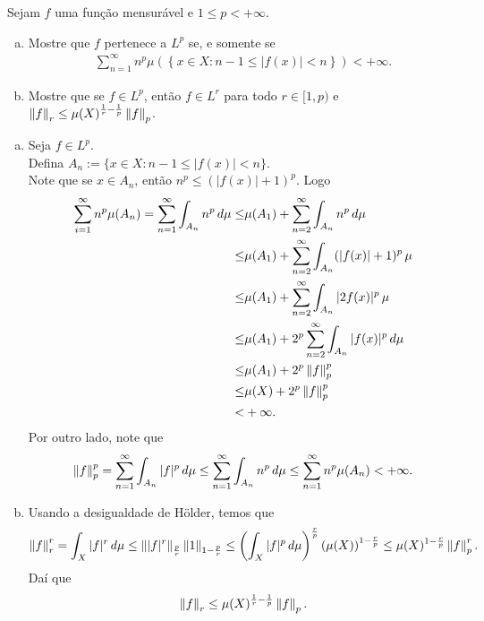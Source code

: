 \begin{homeworkProblem}[2]
  Sejam $f$ uma função mensurável e $1\leq p<+\infty$.
  \begin{enumerate}[a)]
    \item Mostre que $f$ pertenece a $L^{p}$ se, e somente se
      \begin{align*}
        \sum_{n=1}^{\infty}n^{p}\mu\left( \left\{ x\in X:n-1\leq |f(x)|<n \right\} \right)<+\infty.
      \end{align*}
    \item Mostre que se $f\in L^{p}$, então $f\in L^{r}$ para todo $r\in [1,p)$ e $\left\|f\right\|_{r}\leq \mu(X)^{\frac{1}{r}-\frac{1}{p}}\left\|f\right\|_p$. 
  \end{enumerate}
  \begin{solution}
  \begin{enumerate}[a)]
    \item Seja $f\in L^{p}$.\\
      Defina $A_n:=\{x\in X:n-1\leq |f(x)|<n\}$.\\
      Note que se $x\in A_n$, então $n^{p}\leq (|f(x)|+1)^{p}$. Logo
      \begin{align*}
        \sum_{i=1}^{\infty}n^{p}\mu(A_n)=\sum_{n=1}^{\infty}\int_{A_n}n^{p}\,d\mu\leq &\mu(A_1)+\sum_{n=2}^{\infty}\int_{A_n}n^{p}\,d\mu\\
        \leq& \mu(A_1)+\sum_{n=2}^{\infty}\int_{A_n}(|f(x)|+1)^{p}\,\mu\\
        \leq& \mu(A_1)+\sum_{n=2}^{\infty}\int_{A_n}|2f(x)|^{p}\,\mu\\
        \leq& \mu(A_1)+2^{p}\sum_{n=2}^{\infty}\int_{A_n}|f(x)|^{p}\,d\mu\\
        \leq& \mu(A_1)+2^{p}\left\|f\right\|_p^{p}\\
        \leq& \mu(X)+2^{p}\left\|f\right\|_{p}^{p}\\
        <& +\infty.
      \end{align*}
      Por outro lado, note que
      \begin{align*}
        \left\|f\right\|_{p}^{p}=\sum_{n=1}^{\infty}\int_{A_n}|f|^{p}\,d\mu\leq \sum_{n=1}^{\infty}\int_{A_n}n^{p}\,d\mu\leq \sum_{n=1}^{\infty}n^{p}\mu(A_n)<+\infty.
      \end{align*}
    \item Usando a desigualdade de Hölder, temos que
      \begin{align*}
        \left\|f\right\|_{r}^{r}=\int_{X}|f|^{r}\,d\mu\leq \left\||f|^{r}\right\|_{\frac{p}{r}}\left\|1\right\|_{1-\frac{p}{r}}\leq \left( \int_{X}|f|^{p}\,d\mu \right)^{\frac{r}{p}}\left( \mu(X) \right)^{1-\frac{r}{p}}\leq \mu(X)^{1-\frac{r}{p}}\left\|f\right\|_p^{r}.
      \end{align*}
      Daí que
      \begin{align*}
        \left\|f\right\|_{r}\leq \mu(X)^{\frac{1}{r}-\frac{1}{p}}\left\|f\right\|_p.
      \end{align*}
  \end{enumerate}
  \end{solution}
\end{homeworkProblem}
